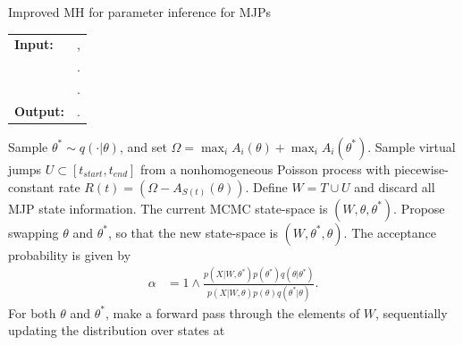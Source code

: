\begin{algorithm}[H]
   \caption{Improved MH for parameter inference for MJPs }
   \label{alg:MH_improved}
  \begin{tabular}{l l}
   \textbf{Input:  } & \text{A set of partial and noisy observations $X$}, \\
                      & \text{The previous MJP path $S(t) = (S, T)$, the previous MJP parameters $\theta$}.\\ 
                     & \text{A  Metropolis-Hasting proposal $q(\cdot | \theta)$}.\\
   \textbf{Output:  }& \text{A new MJP trajectory $\tilde{S} (t) = (\tilde{S}, \tilde{T})$, 
                            new MJP parameters $\tilde{\theta}$}.\\
   \hline
   \end{tabular}
   \begin{algorithmic}[1]
      \State Sample $\theta^* \sim q(\cdot| \theta)$, and 
      set $\Omega = \max_i A_i(\theta) + \max_i A_i(\theta^*)$. 
    \State Sample virtual jumps $U\subset[t_{start}, t_{end}]$ from a nonhomogeneous Poisson process with 
    piecewise-constant rate $R(t) = (\Omega - A_{S(t)}(\theta))$. 
    Define $W = T \cup U$ and discard all MJP state information.
    \State The current MCMC state-space is $(W,\theta,\theta^*)$. Propose swapping
    $\theta$ and $\theta^*$, so that the new state-space is 
    $(W, \theta^*, \theta)$. The acceptance probability is given by
        \begin{align*}
        \alpha %
        &=  1 \wedge \frac{p(X| W,\theta^*)p(\theta^*)q(\theta|\theta^*)}
        {p(X| W,\theta)p(\theta) q(\theta^*|\theta)}.
        \end{align*}
    \State For both $\theta$ and $\theta^*$, make a forward pass through the 
    elements of $W$, sequentially updating the distribution over states at 

\end{algorithmic}
\end{algorithm}
